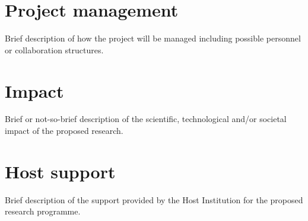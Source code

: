 \documentclass[10pt,a4paper]{article}
\begin{document}
\section{Project management}
Brief description of how the project will be managed including possible personnel or collaboration structures.




\section{Impact}
%
Brief or not-so-brief description of the scientific, technological and/or societal impact of the proposed research.





\section{Host support}
%
Brief description of the support provided by the Host Institution for the proposed research programme.
\end{document}
